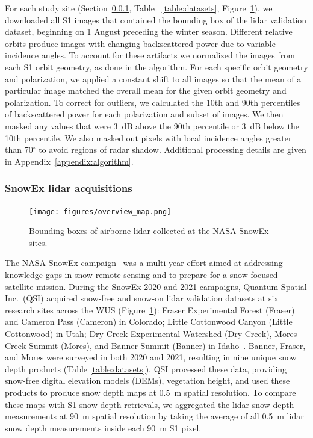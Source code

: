 \documentclass[journal abbreviation, manuscript]{copernicus}
\begin{document}
For each study site (Section~\ref{sec:method.snowex}, Table ~\ref{table:datasets}, Figure~\ref{fig:study_sites}), we downloaded all S1 images that contained the bounding box of the lidar validation dataset, beginning on 1 August preceding the winter season. Different relative orbits produce images with changing backscattered power due to variable incidence angles. To account for these artifacts we normalized the images from each S1 orbit geometry, as done in the \citet{Lievens.2022} algorithm. For each specific orbit geometry and polarization, we applied a constant shift to all images so that the mean of a particular image matched the overall mean for the given orbit geometry and polarization. To correct for outliers, we calculated the 10th and 90th percentiles of backscattered power for each polarization and subset of images. We then masked any values that were 3~dB above the 90th percentile or 3~dB below the 10th percentile. We also masked out pixels with local incidence angles greater than 70$^{\circ}$ to avoid regions of radar shadow. Additional processing details are given in Appendix~\ref{appendix:algorithm}.

\subsubsection{SnowEx lidar acquisitions}\label{sec:method.snowex}

\begin{figure}[htbp]
\texttt{[image: figures/overview\_map.png]}
\caption{Bounding boxes of airborne lidar collected at the NASA SnowEx sites.}
\label{fig:study_sites}
\end{figure}

The NASA SnowEx campaign~\citep{Durand.2019} was a multi-year effort aimed at addressing knowledge gaps in snow remote sensing and to prepare for a snow-focused satellite mission. During the SnowEx 2020 and 2021 campaigns, Quantum Spatial Inc.~(QSI) acquired snow-free and snow-on lidar validation datasets at six research sites across the WUS (Figure~\ref{fig:study_sites}): Fraser Experimental Forest (Fraser) and Cameron Pass (Cameron) in Colorado; Little Cottonwood Canyon (Little Cottonwood) in Utah; Dry Creek Experimental Watershed (Dry Creek), Mores Creek Summit (Mores), and Banner Summit (Banner) in Idaho~\citep{Abedisi.2022, Abedisi.2022g5s}. Banner, Fraser, and Mores were surveyed in both 2020 and 2021, resulting in nine unique snow depth products (Table \ref{table:datasets}). QSI processed these data, providing snow-free digital elevation models (DEMs), vegetation height, and \citep{Abedisi.2022} used these products to produce snow depth maps at 0.5~m spatial resolution. To compare these maps with S1 snow depth retrievals, we aggregated the lidar snow depth measurements at 90~m spatial resolution by taking the average of all 0.5~m lidar snow depth measurements inside each 90~m S1 pixel. 
\end{document}
